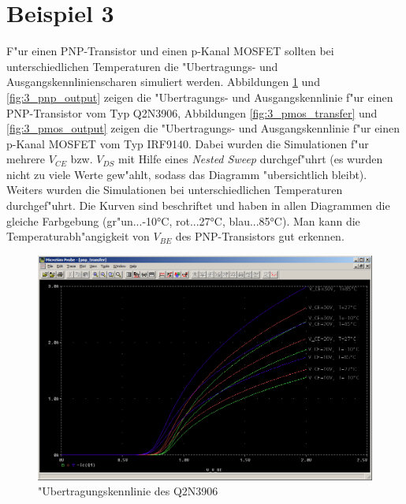 \section{Beispiel 3}

F"ur einen PNP-Transistor und einen p-Kanal MOSFET sollten bei unterschiedlichen Temperaturen die "Ubertragungs- und Ausgangskennlinienscharen simuliert werden. Abbildungen \ref{fig:3_pnp_transfer} und \ref{fig:3_pnp_output} zeigen die "Ubertragungs- und Ausgangskennlinie f"ur einen PNP-Transistor vom Typ Q2N3906, Abbildungen \ref{fig:3_pmos_transfer} und \ref{fig:3_pmos_output} zeigen die "Ubertragungs- und Ausgangskennlinie f"ur einen p-Kanal MOSFET vom Typ IRF9140. Dabei wurden die Simulationen f"ur mehrere $V_{CE}$ bzw. $V_{DS}$ mit Hilfe eines \emph{Nested Sweep} durchgef"uhrt (es wurden nicht zu viele Werte gew"ahlt, sodass das Diagramm "ubersichtlich bleibt). Weiters wurden die Simulationen bei unterschiedlichen Temperaturen durchgef"uhrt. Die Kurven sind beschriftet und haben in allen Diagrammen die gleiche Farbgebung (gr"un...-10°C, rot...27°C, blau...85°C). Man kann die Temperaturabh"angigkeit von $V_{BE}$ des PNP-Transistors gut erkennen.

\begin{figure}%
	\centering
	\includegraphics[width=\textwidth]{fig/ue2_ex3_pnp_transfer.PNG}
	\caption{"Ubertragungskennlinie des Q2N3906}
	\label{fig:3_pnp_transfer}
\end{figure}

